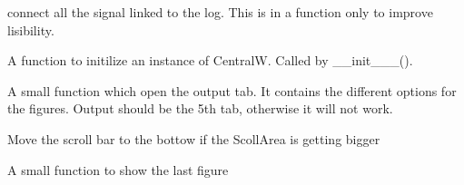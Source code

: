 \documentclass[letterpaper,10pt,english]{sphinxmanual}
\begin{document}
\begin{fulllineitems}
\begin{fulllineitems}
\end{fulllineitems}


\begin{fulllineitems}
\label{\detokenize{index:src_GUI.Main_windows_1.CentralW.connect_signal_log}}
connect all the signal linked to the log. This is in a function only to improve lisibility.

\end{fulllineitems}


\begin{fulllineitems}
\label{\detokenize{index:src_GUI.Main_windows_1.CentralW.init_iu}}
A function to initilize an instance of CentralW. Called by \_\_init\_\_\_().

\end{fulllineitems}


\begin{fulllineitems}
\label{\detokenize{index:src_GUI.Main_windows_1.CentralW.optfig}}
A small function which open the output tab. It contains the different options for the figures.
Output should be the 5th tab, otherwise it will not work.

\end{fulllineitems}


\begin{fulllineitems}
\label{\detokenize{index:src_GUI.Main_windows_1.CentralW.scrolldown}}
Move the scroll bar to the bottow if the ScollArea is getting bigger

\end{fulllineitems}


\begin{fulllineitems}
\label{\detokenize{index:src_GUI.Main_windows_1.CentralW.showfig}}
A small function to show the last figure


\end{fulllineitems}
\end{fulllineitems}
\end{document}
